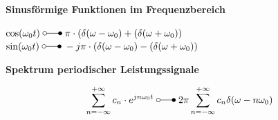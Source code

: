 	\begin{minipage}[t]{9cm}
		\textbf{Sinusf\"ormige Funktionen im Frequenzbereich}\\ 
			\hspace*{0.5cm}
			\parbox{8cm}{
				$\cos(\omega_0t) \; \laplace \; \pi \cdot (\delta(\omega - \omega_0)+ (\delta(\omega + \omega_0))$\\
				$\sin(\omega_0t) \; \laplace \; -j\pi \cdot (\delta(\omega - \omega_0)- (\delta(\omega + \omega_0))$	
			}
	\end{minipage}
	\begin{minipage}[t]{9cm}
		\textbf{Spektrum periodischer Leistungssignale}\\ 
			\hspace*{0.5cm}
			\parbox[b][1.2cm][c]{8cm}{
				$$\sum_{n = -\infty}^{+\infty} c_n \cdot e^{jn\omega_0t} \; \laplace \; 2\pi \sum_{n = -\infty}^{+\infty} c_n\delta(\omega - n\omega_0)$$		
			}
	\end{minipage}
